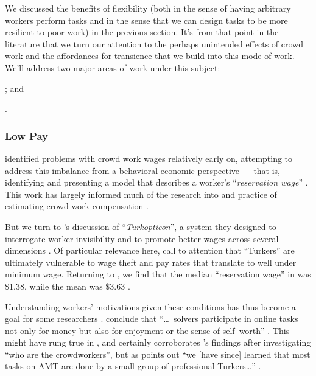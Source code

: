\documentclass[trackingWork]{subfiles}
\begin{document}
{We discussed the benefits of flexibility
(both in the sense of having arbitrary workers perform tasks and
in the sense that we can design tasks to be more resilient to poor work)
in the previous section.
It's from that point in the literature that we turn our attention to
the perhaps unintended effects of crowd work
and the affordances for transience that we build into this mode of work.
We'll address two major areas of work under this subject:
\begin{inlinelist}
\item {}; and
\item {}.
\end{inlinelist}

\subsubsection{Low Pay}\label{sec:lowPay}


\citeauthor{laborEconomicsOfCrowdsourcingHorton}
identified problems with crowd work wages relatively early on,
attempting to address this imbalance from a behavioral economic perspective ---
that is, identifying and presenting a model that describes a worker's
``\textit{reservation wage}''
\cite{laborEconomicsOfCrowdsourcingHorton}.
This work has largely informed much of the research into and practice of estimating crowd work compensation
\cite{incentivesShaw,paolacci2010running}.

But we turn to \citeauthor{turkopticon}'s discussion of ``\textit{Turkopticon}'',
a system they designed to interrogate worker invisibility and to promote better wages across several dimensions
\cite{turkopticon}.
Of particular relevance here,
\citeauthor{turkopticon} call to attention that ``Turkers'' are ultimately vulnerable to
wage theft and
pay rates that translate to well under minimum wage.
Returning to \citeauthor{laborEconomicsOfCrowdsourcingHorton},
we find that the median ``reservation wage'' in \citeyear{laborEconomicsOfCrowdsourcingHorton}
was \$1.38, while the mean was \$3.63
\cite{laborEconomicsOfCrowdsourcingHorton}.

Understanding workers' motivations given these conditions has thus become a goal for some researchers
\cite{whyWouldAnyoneBrewer}.
\citeauthor{Sun20111033} conclude that
``\dots~solvers participate in online tasks
not only for money
but also for enjoyment
or the sense of self--worth''
\cite{Sun20111033}.
This might have rung true in \citeyear{Sun20111033},
and certainly corroborates \citeauthor{Ross}'s findings after investigating
``who are the crowdworkers'',
but as \citeauthor{whoareNOTtheTurkers} points out
``we [have since] learned that most tasks on AMT are done by a small group of professional Turkers\dots''
\cite{Ross,whoareNOTtheTurkers}.

}
\end{document}

